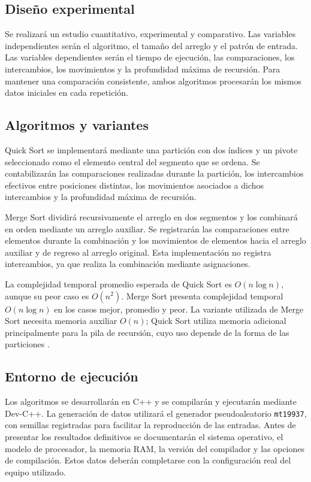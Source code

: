 \subsection{Diseño experimental}

Se realizará un estudio cuantitativo, experimental y comparativo. Las variables independientes serán el algoritmo, el tamaño del arreglo y el patrón de entrada. Las variables dependientes serán el tiempo de ejecución, las comparaciones, los intercambios, los movimientos y la profundidad máxima de recursión. Para mantener una comparación consistente, ambos algoritmos procesarán los mismos datos iniciales en cada repetición.

\subsection{Algoritmos y variantes}

Quick Sort se implementará mediante una partición con dos índices y un pivote seleccionado como el elemento central del segmento que se ordena. Se contabilizarán las comparaciones realizadas durante la partición, los intercambios efectivos entre posiciones distintas, los movimientos asociados a dichos intercambios y la profundidad máxima de recursión.

Merge Sort dividirá recursivamente el arreglo en dos segmentos y los combinará en orden mediante un arreglo auxiliar. Se registrarán las comparaciones entre elementos durante la combinación y los movimientos de elementos hacia el arreglo auxiliar y de regreso al arreglo original. Esta implementación no registra intercambios, ya que realiza la combinación mediante asignaciones.

La complejidad temporal promedio esperada de Quick Sort es \(O(n\log n)\), aunque su peor caso es \(O(n^2)\). Merge Sort presenta complejidad temporal \(O(n\log n)\) en los casos mejor, promedio y peor. La variante utilizada de Merge Sort necesita memoria auxiliar \(O(n)\); Quick Sort utiliza memoria adicional principalmente para la pila de recursión, cuyo uso depende de la forma de las particiones \parencite{cormen2022}.

\subsection{Entorno de ejecución}

Los algoritmos se desarrollarán en C++ y se compilarán y ejecutarán mediante Dev-C++. La generación de datos utilizará el generador pseudoaleatorio \texttt{mt19937}, con semillas registradas para facilitar la reproducción de las entradas. Antes de presentar los resultados definitivos se documentarán el sistema operativo, el modelo de procesador, la memoria RAM, la versión del compilador y las opciones de compilación. Estos datos deberán completarse con la configuración real del equipo utilizado.

